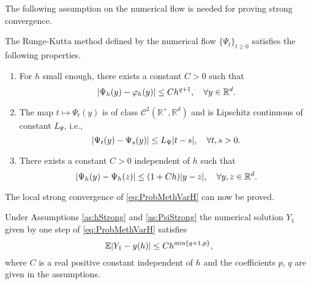 \documentclass{siamart1116}
\numberwithin{theorem}{section}
\DeclarePairedDelimiter{\abs}{\lvert}{\rvert}
\renewcommand{\phi}{\varphi}
\newcommand{\R}{\mathbb{R}}
\newcommand{\E}{\operatorname{\mathbb{E}}}
\begin{document}
The following assumption on the numerical flow is needed for proving strong convergence.
\begin{assumption}\label{as:PsiStrong} The Runge-Kutta method defined by the numerical flow $\{\Psi_t\}_{t\geq 0}$ satisfies the following properties.
	\begin{enumerate}
		\item\label{as:PsiStrong_Order} For $h$ small enough, there exists a constant $C > 0$ such that
			\begin{equation}
				\abs{\Psi_h(y) - \phi_h(y)} \leq Ch^{q+1}, \quad \forall y \in \R^d.
			\end{equation}
		\item\label{as:PsiStrong_Time} The map $t \mapsto \Psi_t(y)$ is of class $\mathcal{C}^2(\R^+, \R^d)$ and is Lipschitz continuous of constant $L_\Psi$, i.e., 
			\begin{equation}\label{eq:LipschitzPsiT}
				\abs{\Psi_t(y) - \Psi_s(y)} \leq L_\Psi \abs{t - s}, \quad \forall t, s > 0.
			\end{equation}
		\item\label{as:PsiStrong_Space} There exists a constant $C > 0$ independent of $h$ such that 
			\begin{equation}\label{eq:LipschitzPsiY}
				\abs{\Psi_h(y) - \Psi_h(z)} \leq (1 + Ch) \abs{y - z}, \quad \forall y, z \in \R^d.
			\end{equation}
	\end{enumerate}
\end{assumption}
The local strong convergence of \eqref{eq:ProbMethVarH} can now be proved. 
\begin{theorem}\label{thm:StrongOrderLocal} Under Assumptions \ref{as:hStrong} and \ref{as:PsiStrong} the numerical solution $Y_1$ given by one step of \eqref{eq:ProbMethVarH} satisfies 
	\begin{equation}
	\E\abs{Y_1 - y(h)} \leq C h^{\min\{q + 1, p\}},
	\end{equation}
	where $C$ is a real positive constant independent of $h$ and the coefficients $p$, $q$ are given in the assumptions.
\end{theorem}
\end{document}
